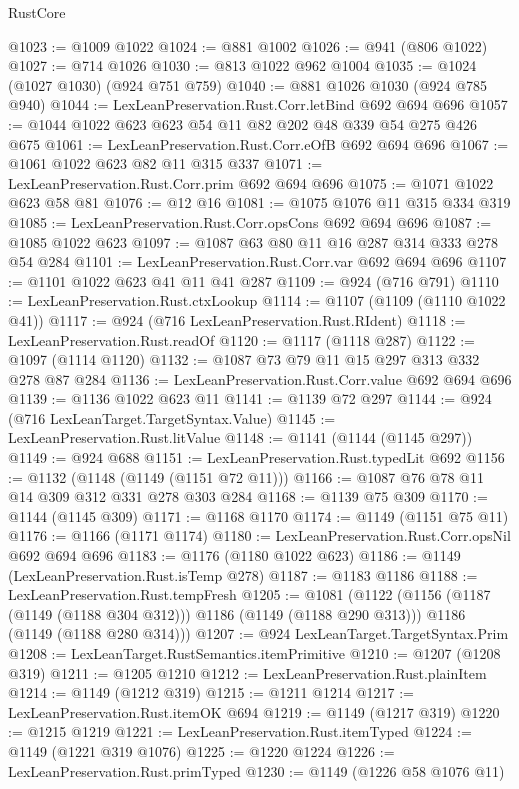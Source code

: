 \begin{lexlean}{RustCore}
\begin{coremodule}
@1023 := @1009 @1022
@1024 := @881 @1002
@1026 := @941 (@806 @1022)
@1027 := @714 @1026
@1030 := @813 @1022 @962 @1004
@1035 := @1024 (@1027 @1030) (@924 @751 @759)
@1040 := @881 @1026 @1030 (@924 @785 @940)
@1044 := LexLeanPreservation.Rust.Corr.letBind @692 @694 @696
@1057 := @1044 @1022 @623 @623 @54 @11 @82 @202 @48 @339 @54 @275 @426 @675
@1061 := LexLeanPreservation.Rust.Corr.eOfB @692 @694 @696
@1067 := @1061 @1022 @623 @82 @11 @315 @337
@1071 := LexLeanPreservation.Rust.Corr.prim @692 @694 @696
@1075 := @1071 @1022 @623 @58 @81
@1076 := @12 @16
@1081 := @1075 @1076 @11 @315 @334 @319
@1085 := LexLeanPreservation.Rust.Corr.opsCons @692 @694 @696
@1087 := @1085 @1022 @623
@1097 := @1087 @63 @80 @11 @16 @287 @314 @333 @278 @54 @284
@1101 := LexLeanPreservation.Rust.Corr.var @692 @694 @696
@1107 := @1101 @1022 @623 @41 @11 @41 @287
@1109 := @924 (@716 @791)
@1110 := LexLeanPreservation.Rust.ctxLookup
@1114 := @1107 (@1109 (@1110 @1022 @41))
@1117 := @924 (@716 LexLeanPreservation.Rust.RIdent)
@1118 := LexLeanPreservation.Rust.readOf
@1120 := @1117 (@1118 @287)
@1122 := @1097 (@1114 @1120)
@1132 := @1087 @73 @79 @11 @15 @297 @313 @332 @278 @87 @284
@1136 := LexLeanPreservation.Rust.Corr.value @692 @694 @696
@1139 := @1136 @1022 @623 @11
@1141 := @1139 @72 @297
@1144 := @924 (@716 LexLeanTarget.TargetSyntax.Value)
@1145 := LexLeanPreservation.Rust.litValue
@1148 := @1141 (@1144 (@1145 @297))
@1149 := @924 @688
@1151 := LexLeanPreservation.Rust.typedLit @692
@1156 := @1132 (@1148 (@1149 (@1151 @72 @11)))
@1166 := @1087 @76 @78 @11 @14 @309 @312 @331 @278 @303 @284
@1168 := @1139 @75 @309
@1170 := @1144 (@1145 @309)
@1171 := @1168 @1170
@1174 := @1149 (@1151 @75 @11)
@1176 := @1166 (@1171 @1174)
@1180 := LexLeanPreservation.Rust.Corr.opsNil @692 @694 @696
@1183 := @1176 (@1180 @1022 @623)
@1186 := @1149 (LexLeanPreservation.Rust.isTemp @278)
@1187 := @1183 @1186
@1188 := LexLeanPreservation.Rust.tempFresh
@1205 := @1081
    (@1122
      (@1156 (@1187 (@1149 (@1188 @304 @312))) @1186 (@1149 (@1188 @290 @313)))
      @1186
      (@1149 (@1188 @280 @314)))
@1207 := @924 LexLeanTarget.TargetSyntax.Prim
@1208 := LexLeanTarget.RustSemantics.itemPrimitive
@1210 := @1207 (@1208 @319)
@1211 := @1205 @1210
@1212 := LexLeanPreservation.Rust.plainItem
@1214 := @1149 (@1212 @319)
@1215 := @1211 @1214
@1217 := LexLeanPreservation.Rust.itemOK @694
@1219 := @1149 (@1217 @319)
@1220 := @1215 @1219
@1221 := LexLeanPreservation.Rust.itemTyped
@1224 := @1149 (@1221 @319 @1076)
@1225 := @1220 @1224
@1226 := LexLeanPreservation.Rust.primTyped
@1230 := @1149 (@1226 @58 @1076 @11)

\end{coremodule}
\end{lexlean}
